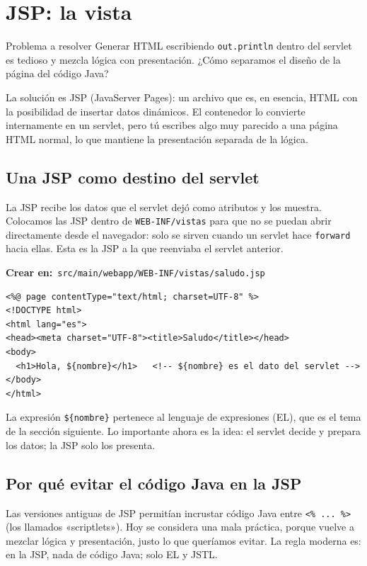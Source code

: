 \documentclass[11pt]{article}
\begin{document}
\section{JSP: la vista}
\begin{cajaproblema}{Problema a resolver}
Generar HTML escribiendo \texttt{out.\allowbreak{}println} dentro del servlet es tedioso y mezcla lógica con presentación. ¿Cómo separamos el diseño de la página del código Java?\par
\end{cajaproblema}
La solución es JSP (JavaServer Pages): un archivo que es, en esencia, HTML con la posibilidad de insertar datos dinámicos. El contenedor lo convierte internamente en un servlet, pero tú escribes algo muy parecido a una página HTML normal, lo que mantiene la presentación separada de la lógica.

\subsection{Una JSP como destino del servlet}
La JSP recibe los datos que el servlet dejó como atributos y los muestra. Colocamos las JSP dentro de \texttt{WEB-INF/\allowbreak{}vistas} para que no se puedan abrir directamente desde el navegador: solo se sirven cuando un servlet hace \texttt{forward} hacia ellas. Esta es la JSP a la que reenviaba el servlet anterior.

{\small\color{jwebazulo}\textbf{Crear en:}~}\texttt{src/\allowbreak{}main/\allowbreak{}webapp/\allowbreak{}WEB-INF/\allowbreak{}vistas/\allowbreak{}saludo.\allowbreak{}jsp}\par\nobreak\vspace{-1pt}
\begin{cajacodigo}
\begin{lstlisting}[style=markup]
<%@ page contentType="text/html; charset=UTF-8" %>
<!DOCTYPE html>
<html lang="es">
<head><meta charset="UTF-8"><title>Saludo</title></head>
<body>
  <h1>Hola, ${nombre}</h1>   <!-- ${nombre} es el dato del servlet -->
</body>
</html>
\end{lstlisting}
\end{cajacodigo}
\vspace{2pt}
La expresión \texttt{\$\{nombre\}} pertenece al lenguaje de expresiones (EL), que es el tema de la sección siguiente. Lo importante ahora es la idea: el servlet decide y prepara los datos; la JSP solo los presenta.

\subsection{Por qué evitar el código Java en la JSP}
Las versiones antiguas de JSP permitían incrustar código Java entre \texttt{\textless{}\% .\allowbreak{}.\allowbreak{}.\allowbreak{} \%\textgreater{}} (los llamados «scriptlets»). Hoy se considera una mala práctica, porque vuelve a mezclar lógica y presentación, justo lo que queríamos evitar. La regla moderna es: en la JSP, nada de código Java; solo EL y JSTL.
\end{document}

